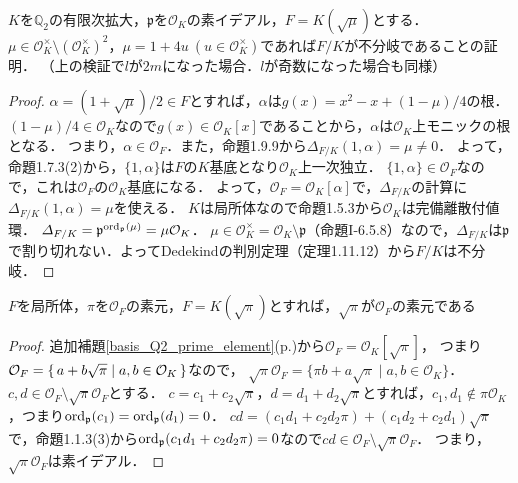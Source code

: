 \begin{screen}
  $K$を$\mathbb{Q}_2$の有限次拡大，$\mathfrak{p}$を$\mathcal{O}_K$の素イデアル，$F=K(\sqrt{\mu})$とする．
  $\mu\in\mathcal{O}_K^\times\setminus(\mathcal{O}_K^\times)^2$，$\mu=1+4u\ (u\in\mathcal{O}_K^\times)$であれば$F/K$が不分岐であることの証明．
  （上の検証で$l$が$2m$になった場合．$l$が奇数になった場合も同様）
\end{screen}
\begin{proof}
  $\alpha=(1+\sqrt{\mu})/2\in F$とすれば，$\alpha$は$g(x)=x^2-x+(1-\mu)/4$の根．
  $(1-\mu)/4\in\mathcal{O}_K$なので$g(x)\in\mathcal{O}_K[x]$であることから，$\alpha$は$\mathcal{O}_K$上モニックの根となる．
  つまり，$\alpha\in\mathcal{O}_F$．また，命題1.9.9から$\varDelta_{F/K}(1,\alpha)=\mu\neq 0$．
  よって，命題1.7.3(2)から，$\{1,\alpha\}$は$F$の$K$基底となり$\mathcal{O}_K$上一次独立．
  $\{1,\alpha\}\in\mathcal{O}_F$なので，これは$\mathcal{O}_F$の$\mathcal{O}_K$基底になる．
  よって，$\mathcal{O}_F=\mathcal{O}_K[\alpha]$で，$\varDelta_{F/K}$の計算に$\varDelta_{F/K}(1,\alpha)=\mu$を使える．
  $K$は局所体なので命題1.5.3から$\mathcal{O}_K$は完備離散付値環．
  $\varDelta_{F/K}=\mathfrak{p}^{\operatorname{ord}_\mathfrak{p}(\mu)}=\mu\mathcal{O}_K$．
  $\mu\in\mathcal{O}_K^\times = \mathcal{O}_K \setminus \mathfrak{p}$（命題I-6.5.8）なので，$\varDelta_{F/K}$は$\mathfrak{p}$で割り切れない．よってDedekindの判別定理（定理1.11.12）から$F/K$は不分岐．
\end{proof}

\begin{screen}
  $F$を局所体，$\pi$を$\mathcal{O}_F$の素元，$F=K(\sqrt{\pi})$とすれば，$\sqrt{\pi}$が$\mathcal{O}_F$の素元である
\end{screen}
\begin{proof}
  追加補題\ref{basis_Q2_prime_element}(p.\pageref{basis_Q2_prime_element})から$\mathcal{O}_F=\mathcal{O}_K[\sqrt{\pi}]$，
  つまり$\mathcal{O}_F=\set{a+b\sqrt{\pi} | a,b\in\mathcal{O}_K}$なので，
  $\sqrt{\pi}\mathcal{O}_F=\{\pi b+a\sqrt{\pi}\mid a,b\in\mathcal{O}_K\}$．
  $c,d\in\mathcal{O}_F\setminus\sqrt{\pi}\mathcal{O}_F$とする．
  $c=c_1+c_2\sqrt{\pi}$，$d=d_1+d_2\sqrt{\pi}$とすれば，$c_1,d_1\not\in\pi\mathcal{O}_K$，つまり$\operatorname{ord}_\mathfrak{p}(c_1)=\operatorname{ord}_\mathfrak{p}(d_1)=0$．
  $cd=(c_1d_1+c_2d_2\pi)+(c_1d_2+c_2d_1)\sqrt{\pi}$で，命題1.1.3(3)から$\operatorname{ord}_\mathfrak{p}(c_1d_1+c_2d_2\pi)=0$なので$cd\in\mathcal{O}_F\setminus\sqrt{\pi}\mathcal{O}_F$．
  つまり，$\sqrt{\pi}\mathcal{O}_F$は素イデアル．
\end{proof}

